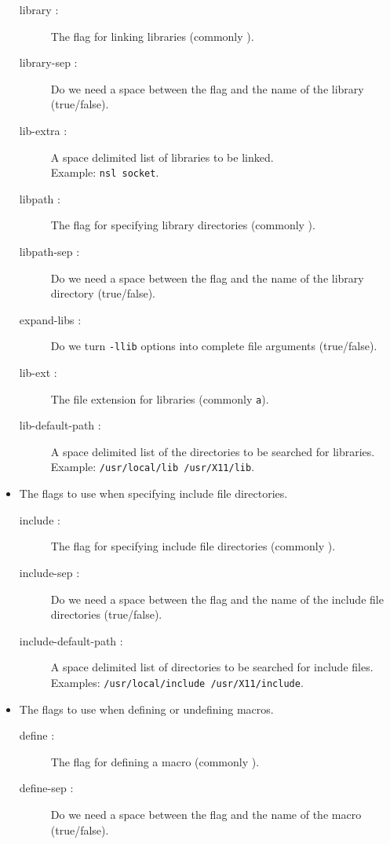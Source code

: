 \begin{itemize}
\begin{description}
\item    [library :] The flag for linking libraries (commonly ).
\item    [library-sep :] Do we need a space between the flag and the name of the library (true/false).
\item    [lib-extra :] A space delimited list of libraries to be linked. \\ Example: {\tt nsl socket}. 

\item    [libpath :] The flag for specifying library directories (commonly ).
\item    [libpath-sep :] Do we need a space between the flag and the name of the library directory (true/false).
\item    [expand-libs :] Do we turn {\tt -llib} options into complete file arguments (true/false).
\item    [lib-ext :] The file extension for libraries (commonly {\tt a}).
\item    [lib-default-path :] A space delimited list of the directories to be searched for libraries. \\ 
          Example: {\tt /usr/local/lib /usr/X11/lib}.
\end{description}


\item The flags to use when specifying include file directories.
\begin{description}
\item    [include :] The flag for specifying include file directories (commonly ).
\item    [include-sep :] Do we need a space between the flag and the name of the include file directories (true/false).
\item    [include-default-path :]  A space delimited list of directories to be searched for include files. \\
         Examples: {\tt /usr/local/include /usr/X11/include}.
\end{description}


\item The flags to use when defining or undefining macros.
\begin{description}
\item    [define :] The flag for defining a macro (commonly ).
\item    [define-sep :] Do we need a space between the flag and the name of the macro (true/false).


\end{description}
\end{itemize}
